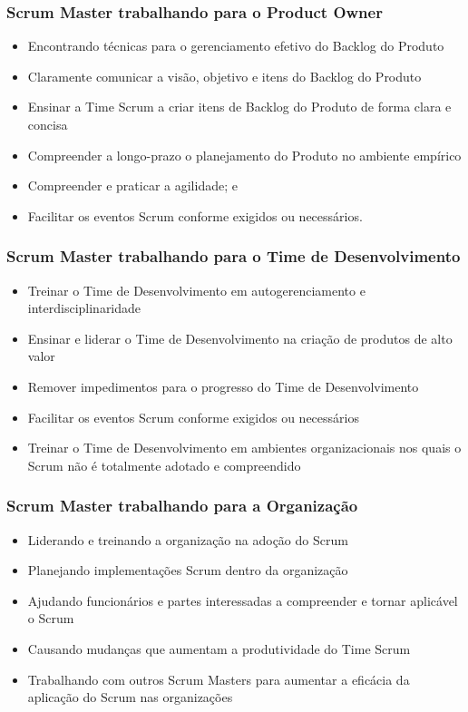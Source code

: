 \begin{frame}
 \frametitle{Scrum Master trabalhando para o Product Owner}
 \begin{itemize}
  \item Encontrando técnicas para o gerenciamento efetivo do Backlog do Produto
  \item Claramente comunicar a visão, objetivo e itens do Backlog do Produto
  \item Ensinar a Time Scrum a criar itens de Backlog do Produto de forma clara e concisa
  \item Compreender a longo-prazo o planejamento do Produto no ambiente empírico
  \item Compreender e praticar a agilidade; e
  \item Facilitar os eventos Scrum conforme exigidos ou necessários.
 \end{itemize}
\end{frame}

\begin{frame}
 \frametitle{Scrum Master trabalhando para o Time de Desenvolvimento}
 \begin{itemize}
  \item Treinar o Time de Desenvolvimento em autogerenciamento e interdisciplinaridade
  \item Ensinar e liderar o Time de Desenvolvimento na criação de produtos de alto valor
  \item Remover impedimentos para o progresso do Time de Desenvolvimento
  \item Facilitar os eventos Scrum conforme exigidos ou necessários
  \item Treinar o Time de Desenvolvimento em ambientes organizacionais nos quais o Scrum não é
totalmente adotado e compreendido
 \end{itemize}
\end{frame}

\begin{frame}
 \frametitle{Scrum Master trabalhando para a Organização}
 \begin{itemize}
  \item Liderando e treinando a organização na adoção do Scrum
  \item Planejando implementações Scrum dentro da organização
  \item Ajudando funcionários e partes interessadas a compreender e tornar aplicável o Scrum
  \item Causando mudanças que aumentam a produtividade do Time Scrum
  \item Trabalhando com outros Scrum Masters para aumentar a eficácia da aplicação do Scrum
nas organizações
 \end{itemize}
\end{frame}



